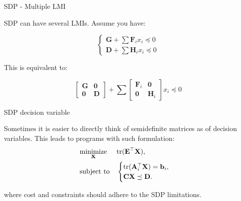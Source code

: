 \documentclass{beamer}
\begin{document}
\begin{frame}{SDP - Multiple LMI}
\begin{flushleft}

SDP can have several LMIs. Assume you have:

\begin{equation}
    \begin{cases}
        \mathbf{G} + \sum \mathbf{F}_i x_i \preceq 0 \\
        \mathbf{D} + \sum \mathbf{H}_i x_i \preceq 0
    \end{cases}
\end{equation}


This is equivalent to:

\begin{equation}
    \begin{bmatrix} 
            \mathbf{G} & \mathbf{0} \\
            \mathbf{0} & \mathbf{D}
    \end{bmatrix} +
    \sum
    \begin{bmatrix} 
            \mathbf{F}_i & \mathbf{0} \\
            \mathbf{0}   & \mathbf{H}_i
    \end{bmatrix}
    x_i \preceq 0
\end{equation}

\end{flushleft}
\end{frame}




\begin{frame}{SDP decision variable}
\begin{flushleft}

Sometimes it is easier to directly think of semidefinite matrices as of decision variables. This leads to programs with such formulation:
%
\begin{equation}
\begin{aligned}
& \underset{\mathbf{X}}{\text{minimize}}
& & \text{tr}(\mathbf{E}^\top \mathbf{X}), \\
& \text{subject to}
& & \begin{cases}
     \text{tr}(\mathbf{A}_i^\top\mathbf{X}) =  \mathbf{b}_i, \\
     \mathbf{C}\mathbf{X} \preceq \mathbf{D}.
    \end{cases}
\end{aligned}
\end{equation}

where cost and constraints should adhere to the SDP limitations.

\end{flushleft}
\end{frame}
\end{document}
